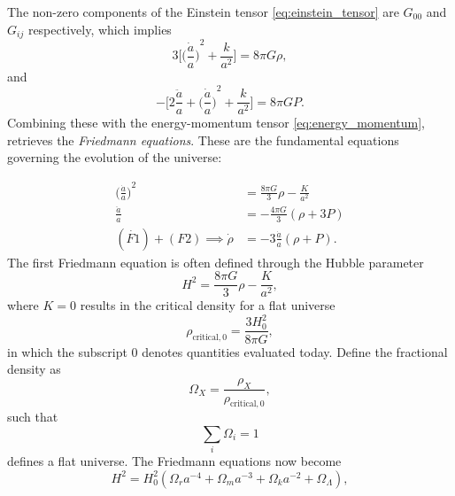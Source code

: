 The non-zero components of the Einstein tensor \cref{eq:einstein_tensor} are \(G_{00}\) and \(G_{i j}\) respectively, which implies
%
\begin{equation}
	3\Bigg[ {\bigg(\frac{\dot{a}}{a}\bigg)}^{2} + \frac{k}{a^{2}} \Bigg]
	= 8\pi G\rho,
\end{equation}
%
and
%
\begin{equation}
	-\Bigg[ 2\frac{\ddot{a}}{a} + {\bigg(\frac{\dot{a}}{a}\bigg)}^{2} + \frac{k}{a^{2}} \Bigg]
	= 8\pi G P.
\end{equation}
%
Combining these with the energy-momentum tensor \cref{eq:energy_momentum}, retrieves the \emph{Friedmann equations}.
These are the fundamental equations governing the evolution of the universe:
%
\addtocounter{equation}{-1}
%
\begin{subequations}
	\begin{align}
		{\bigg(\frac{\dot{a}}{a}\bigg)}^{2}   & = \frac{8\pi G}{3} \rho - \frac{K}{a^{2}} \tag{F1} \label{eq:F1} \\
		\frac{\ddot{a}}{a}                    & = -\frac{4\pi G}{3}(\rho + 3P) \tag{F2}                          \\
		(\dot{F1}) + (F2) \implies \dot{\rho} & = -3\frac{\dot{a}}{a}(\rho + P). \tag{F3}
	\end{align}
\end{subequations}
%
The first Friedmann equation is often defined through the Hubble parameter
%
\begin{equation}
	H^{2}
	= \frac{8\pi G}{3} \rho - \frac{K}{a^{2}},
\end{equation}
%
where \(K=0\) results in the critical density for a flat universe
%
\begin{equation}
	\rho_{\text{critical},0}
	= \frac{3H_{0}^{2}}{8\pi G},
\end{equation}
%
in which the subscript \(0\) denotes quantities evaluated today.
Define the fractional density as
%
\begin{equation}
	\Omega_{X}
	= \frac{\rho_{X}}{\rho_{\text{critical},0}},
\end{equation}
%
such that
%
\begin{equation}
	\sum\limits_{i}\Omega_{i}
	= 1
\end{equation}
%
defines a flat universe.
The Friedmann equations now become
%
\begin{equation}
	H^{2}
	= H_{0}^{2} (\Omega_{r}a^{-4} + \Omega_{m}a^{-3} + \Omega_{k}a^{-2} + \Omega_{\Lambda}),
\end{equation}
